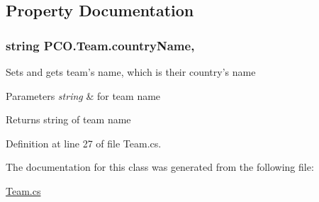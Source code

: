 \subsection{Property Documentation}
\hypertarget{classPCO_1_1Team_a1bcba510cc543dda5ce68b295e9ee26e}{
\subsubsection[{country\+Name}]{\setlength{\rightskip}{0pt plus 5cm}string P\+C\+O.\+Team.\+country\+Name\hspace{0.3cm}{\ttfamily [get]}, {\ttfamily [set]}}}\label{classPCO_1_1Team_a1bcba510cc543dda5ce68b295e9ee26e}
Sets and gets team's name, which is their country's name 
\begin{DoxyParams}{Parameters}
{\em string} & for team name \\
\hline
\end{DoxyParams}
\begin{DoxyReturn}{Returns}
string of team name 
\end{DoxyReturn}


Definition at line 27 of file Team.\+cs.



The documentation for this class was generated from the following file\+:\begin{DoxyCompactItemize}
\item 
\hyperlink{Team_8cs}{Team.\+cs}\end{DoxyCompactItemize}
